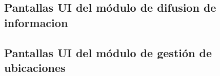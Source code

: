 \subsection{Pantallas UI del módulo de difusion de informacion}


\clearpage
\subsection{Pantallas UI del módulo de gestión de ubicaciones}


\clearpage